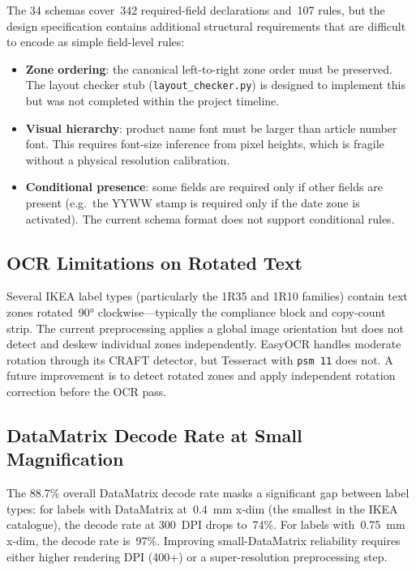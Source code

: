 The 34 schemas cover~342 required-field declarations and~107 rules, but the design
specification contains additional structural requirements that are difficult to encode as
simple field-level rules:

\begin{itemize}
  \item \textbf{Zone ordering}: the canonical left-to-right zone order must be preserved.
  The layout checker stub (\texttt{layout\_checker.py}) is designed to implement this but
  was not completed within the project timeline.
  \item \textbf{Visual hierarchy}: product name font must be larger than article number
  font. This requires font-size inference from pixel heights, which is fragile without
  a physical resolution calibration.
  \item \textbf{Conditional presence}: some fields are required only if other fields are
  present (e.g.\ the YYWW stamp is required only if the date zone is activated). The
  current schema format does not support conditional rules.
\end{itemize}

\subsection{OCR Limitations on Rotated Text}

Several IKEA label types (particularly the 1R35 and 1R10 families) contain text zones
rotated~90° clockwise—typically the compliance block and copy-count strip. The current
preprocessing applies a global image orientation but does not detect and deskew individual
zones independently. EasyOCR handles moderate rotation through its CRAFT detector, but
Tesseract with \texttt{psm 11} does not. A future improvement is to detect rotated zones
and apply independent rotation correction before the OCR pass.

\subsection{DataMatrix Decode Rate at Small Magnification}

The 88.7\% overall DataMatrix decode rate masks a significant gap between label types:
for labels with DataMatrix at~0.4~mm x-dim (the smallest in the IKEA catalogue), the
decode rate at 300~DPI drops to~74\%. For labels with~0.75~mm x-dim, the decode rate
is~97\%. Improving small-DataMatrix reliability requires either higher rendering DPI (400+)
or a super-resolution preprocessing step.

